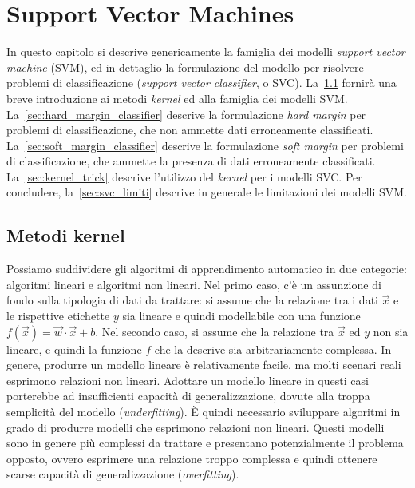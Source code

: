 \chapter{Support Vector Machines}\label{chap:SVC}
In questo capitolo si descrive genericamente la famiglia dei modelli \emph{support vector machine} (SVM), ed in dettaglio la formulazione del modello per risolvere problemi di classificazione (\emph{support vector classifier}, o SVC). La~\cref{sec:kernel_methods} fornirà una breve introduzione ai metodi \emph{kernel} ed alla famiglia dei modelli SVM. La~\cref{sec:hard_margin_classifier} descrive la formulazione \emph{hard margin} per problemi di classificazione, che non ammette dati erroneamente classificati. La~\cref{sec:soft_margin_classifier} descrive la formulazione \emph{soft margin} per problemi di classificazione, che ammette la presenza di dati erroneamente classificati. La~\cref{sec:kernel_trick} descrive l'utilizzo del \emph{kernel} per i modelli SVC. Per concludere, la~\cref{sec:svc_limiti} descrive in generale le limitazioni dei modelli SVM.

\section{Metodi kernel}\label{sec:kernel_methods}
Possiamo suddividere gli algoritmi di apprendimento automatico in due categorie: algoritmi lineari e algoritmi non lineari. Nel primo caso, c'è un assunzione di fondo sulla tipologia di dati da trattare: si assume che la relazione tra i dati $\Vec{x}$ e le rispettive etichette $y$ sia lineare e quindi modellabile con una funzione $f(\Vec{x}) = \Vec{w}\cdot\Vec{x} + b$.
Nel secondo caso, si assume che la relazione tra $\Vec{x}$ ed $y$ non sia lineare, e quindi la funzione $f$ che la descrive sia arbitrariamente complessa.
In genere, produrre un modello lineare è relativamente facile, ma molti scenari reali esprimono relazioni non lineari. Adottare un modello lineare in questi casi porterebbe ad insufficienti capacità di generalizzazione, dovute alla troppa semplicità del modello (\emph{underfitting}). \`E quindi necessario sviluppare algoritmi in grado di produrre modelli che esprimono relazioni non lineari. Questi modelli sono in genere più complessi da trattare e presentano potenzialmente il problema opposto, ovvero esprimere una relazione troppo complessa e quindi ottenere scarse capacità di generalizzazione (\emph{overfitting}).

